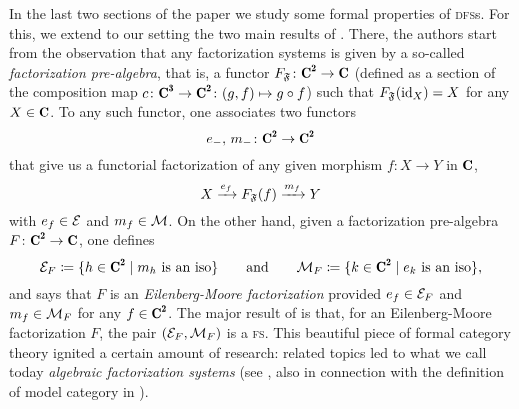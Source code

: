 In the last two sections of the paper we study some formal properties of \textsc{dfs}s. For this, we extend to our setting the two main results of \cite{Korostenski199357}. There, the authors start from the observation that any factorization systems is given by a so-called \emph{factorization pre-algebra}, that is, a functor $F_\F\colon \C^\due \to \C$ (defined as a section of the composition map $c\colon \C^\tre \to \C^\due\colon (g,f)\mapsto g\circ f$) such that $F_{\mathfrak{F}}(\operatorname{id}_X)=X$ for any $X\in \C$. To any such functor, one associates two functors
\[
e_{-},\, m_{-}\colon \C^\due\to \C^\due
\]
that give us a functorial factorization of any given morphism $f\colon X\to Y$ in $\C$,  
\[
X\xrightarrow{e_f}F_{\mathfrak{F}}(f)\xrightarrow{m_f}Y
\] 
with $e_f\in \mathcal{E}$ and $m_f\in \mathcal{M}$. On the other hand, given a factorization pre-algebra $F\colon \C^\due \to \C$, one defines
\[
\E_F \coloneqq \{h\in \C^\due \mid m_h\text{ is an iso}\}\qquad\text{and}\qquad
\M_F \coloneqq \{k\in \C^\due \mid e_k\text{ is an iso}\},
\]
and says that $F$ is an \emph{Eilenberg\hyp{}Moore factorization} provided $e_f\in \mathcal{E}_F$ and $m_f\in \mathcal{M}_F$ for any $f\in \C^\due$. The major result of \cite[\athm\textbf{A}]{Korostenski199357} is that, for an Eilenberg\hyp{}Moore factorization $F$, the pair $(\mathcal{E}_F,\mathcal{M}_F)$ is a \textsc{fs}. This beautiful piece of formal category theory  ignited a certain amount of research: related topics led to what we call today \emph{algebraic factorization systems} (see \cite{Gar,grandis2006natural}, also in connection with the definition of model category in \cite{riehl2011algebraic}).


